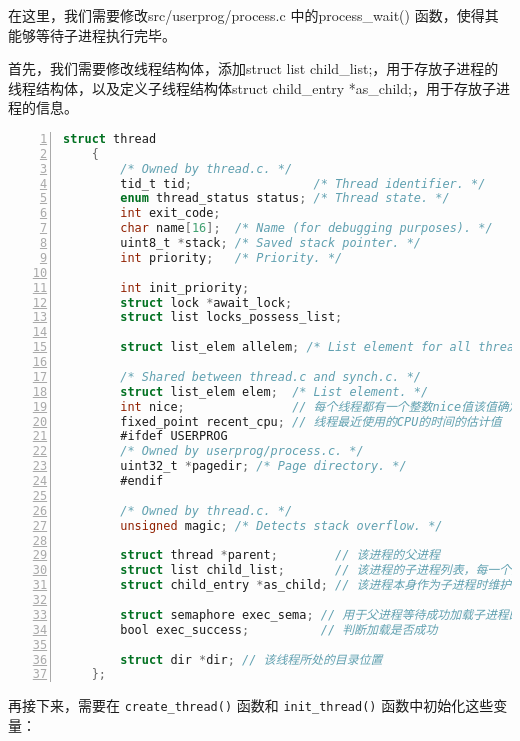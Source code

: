 \documentclass{article}
\begin{document}
	在这里，我们需要修改src/userprog/process.c 中的process\_wait() 函数，使得其能够等待子进程执行完毕。
	
	首先，我们需要修改线程结构体，添加struct list child\_list;，用于存放子进程的线程结构体，以及定义子线程结构体struct child\_entry *as\_child;，用于存放子进程的信息。
	
	\begin{lstlisting}[xleftmargin = 4em,xrightmargin = 4em, aboveskip = 1em, numbers = left, language = C,title=src/threads/thread.h - thread结构体]
    struct thread
    {
    	/* Owned by thread.c. */
    	tid_t tid;                 /* Thread identifier. */
    	enum thread_status status; /* Thread state. */
    	int exit_code;
    	char name[16];  /* Name (for debugging purposes). */
    	uint8_t *stack; /* Saved stack pointer. */
    	int priority;   /* Priority. */
    	
    	int init_priority;
    	struct lock *await_lock;
    	struct list locks_possess_list;
    	
    	struct list_elem allelem; /* List element for all threads list. */
    	
    	/* Shared between thread.c and synch.c. */
    	struct list_elem elem;  /* List element. */
    	int nice;               // 每个线程都有一个整数nice值该值确定该线程与其他线程应该有多“不错”[-20,20]
    	fixed_point recent_cpu; // 线程最近使用的CPU的时间的估计值
    	#ifdef USERPROG
    	/* Owned by userprog/process.c. */
    	uint32_t *pagedir; /* Page directory. */
    	#endif
    	
    	/* Owned by thread.c. */
    	unsigned magic; /* Detects stack overflow. */
    	
    	struct thread *parent;        // 该进程的父进程
    	struct list child_list;       // 该进程的子进程列表，每一个元素为child_entry类型的
    	struct child_entry *as_child; // 该进程本身作为子进程时维护的结构
    	
    	struct semaphore exec_sema; // 用于父进程等待成功加载子进程的可执行文件时的阻塞
    	bool exec_success;          // 判断加载是否成功
    	
    	struct dir *dir; // 该线程所处的目录位置
    };
	\end{lstlisting}
	
	再接下来，需要在 \texttt{create\_thread()} 函数和 \texttt{init\_thread()} 函数中初始化这些变量：
	
\end{document}

